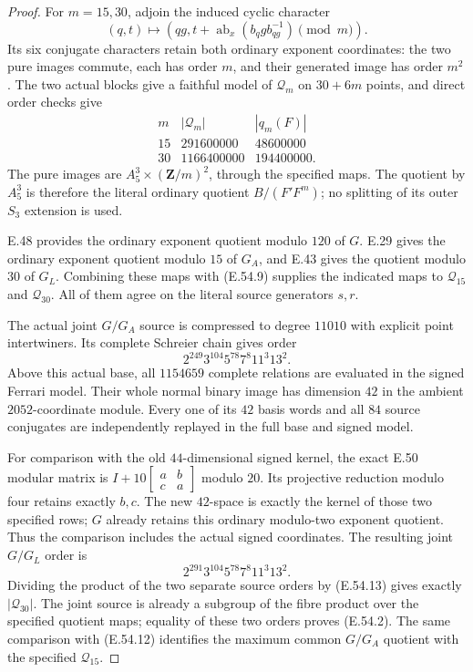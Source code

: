 \begin{proof}
For $m=15,30$, adjoin the induced cyclic character
\[
 (q,t)\longmapsto
 \left(qg,t+\operatorname{ab}_x(b_qgb_{qg}^{-1})\pmod m\right).
 \tag{E.54.10}
\]
Its six conjugate characters retain both ordinary exponent
coordinates: the two pure images commute, each has order
$m$, and their generated image has order $m^2$.
The two actual blocks give a faithful model of
$\mathcal Q_m$ on $30+6m$ points, and direct order checks give
\[
 \begin{array}{c|r|r}
 m&|\mathcal Q_m|&|q_m(F)|\\\hline
 15&291600000&48600000\\
 30&1166400000&194400000.
 \end{array}
 \tag{E.54.11}
\]
The pure images are $A_5^3\times(\mathbf Z/m)^2$, through
the specified maps.  The quotient by $A_5^3$ is therefore
the literal ordinary quotient $B/(F'F^m)$; no splitting of
its outer $S_3$ extension is used.

E.48 provides the ordinary exponent quotient modulo $120$
of $G$.  E.29 gives the ordinary exponent quotient modulo
$15$ of $G_A$, and E.43 gives the quotient modulo $30$ of
$G_L$.  Combining these maps with \textup{(E.54.9)} supplies
the indicated maps to $\mathcal Q_{15}$ and
$\mathcal Q_{30}$.  All of them agree on the literal
source generators $s,r$.

The actual joint $G/G_A$ source is compressed to degree
$11010$ with explicit point intertwiners.  Its complete
Schreier chain gives order
\[
                  2^{249}3^{104}5^{78}7^8 11^3 13^2.
 \tag{E.54.12}
\]
Above this actual base, all $1154659$ complete relations
are evaluated in the signed Ferrari model.  Their whole
normal binary image has dimension $42$ in the ambient
$2052$-coordinate module.  Every one of its $42$ basis
words and all $84$ source conjugates are independently
replayed in the full base and signed model.

For comparison with the old $44$-dimensional signed kernel,
the exact E.50 modular matrix is
$I+10\left[\begin{smallmatrix}a&b\\c&a\end{smallmatrix}\right]$
modulo $20$.  Its projective reduction modulo four retains
exactly $b,c$.  The new $42$-space is exactly the kernel of
those two specified rows; $G$ already retains this ordinary
modulo-two exponent quotient.  Thus the comparison includes
the actual signed coordinates.
The resulting joint $G/G_L$ order is
\[
                  2^{291}3^{104}5^{78}7^8 11^3 13^2.
 \tag{E.54.13}
\]
Dividing the product of the two separate source orders by
\textup{(E.54.13)} gives exactly $|\mathcal Q_{30}|$.
The joint source is already a subgroup of the fibre product
over the specified quotient maps; equality of these two
orders proves \textup{(E.54.2)}.  The same comparison with
\textup{(E.54.12)} identifies the maximum common $G/G_A$
quotient with the specified $\mathcal Q_{15}$.


\end{proof}
